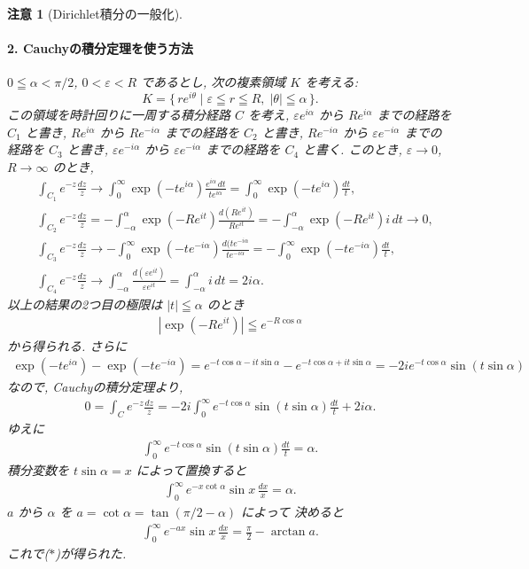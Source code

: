 \documentclass[12pt,twoside]{jarticle}
\newcommand\eps{\varepsilon}
\theoremstyle{jplain}
\theoremstyle{jplain}
\theoremstyle{jplain}
\newtheorem{remark}[theorem]{注意}
\numberwithin{theorem}{section}
\numberwithin{equation}{section}
\numberwithin{figure}{section}
\numberwithin{table}{section}
\begin{document}
\begin{remark}[Dirichlet積分の一般化]
  \paragraph{2. Cauchyの積分定理を使う方法}
  $0\leqq\alpha<\pi/2$, $0<\eps<R$ であるとし, 次の複素領域 $K$ を考える:
  \begin{equation*}
    K = \{\, re^{i\theta}\mid \eps\leqq r\leqq R,\; |\theta|\leqq\alpha\,\}.
  \end{equation*}
  この領域を時計回りに一周する積分経路 $C$ を考え,
  $\eps e^{i\alpha}$ から $Re^{i\alpha}$ までの経路を $C_1$ と書き,
  $Re^{i\alpha}$ から $Re^{-i\alpha}$ までの経路を $C_2$ と書き,
  $Re^{-i\alpha}$ から $\eps e^{-i\alpha}$ までの経路を $C_3$ と書き,
  $\eps e^{-i\alpha}$ から $\eps e^{-i\alpha}$ までの経路を $C_4$ と書く.
  このとき, $\eps\to 0$, $R\to\infty$ のとき,
  \begin{align*}
    &\int_{C_1} e^{-z}\frac{dz}{z}
    \to\int_0^\infty \exp(-te^{i\alpha})\frac{e^{i\alpha}\,dt}{te^{i\alpha}}
    =\int_0^\infty \exp(-te^{i\alpha})\frac{dt}{t},
    \\
    &\int_{C_2} e^{-z}\frac{dz}{z}
    =-\int_{-\alpha}^\alpha \exp(-Re^{it})\frac{d(Re^{it})}{Re^{it}}
    =-\int_{-\alpha}^\alpha \exp(-Re^{it})i\,dt
    \to 0,
    \\
    &\int_{C_3} e^{-z}\frac{dz}{z}
    \to-\int_0^\infty \exp(-te^{-i\alpha})\frac{d(te^{-i\alpha}}{te^{-i\alpha}}
    =-\int_0^\infty \exp(-te^{-i\alpha})\frac{dt}{t},
    \\
    &\int_{C_4} e^{-z}\frac{dz}{z}
    \to \int_{-\alpha}^\alpha \frac{d(\eps e^{it})}{\eps e^{it}}
    = \int_{-\alpha}^\alpha i\,dt
    = 2i\alpha.
  \end{align*}
  以上の結果の2つ目の極限は $|t|\leqq\alpha$ のとき
  \begin{align*}
    |\exp(-Re^{it})|\leqq e^{-R\cos\alpha}
  \end{align*}
  から得られる. さらに
  \begin{align*}
    \exp(-te^{i\alpha})-\exp(-te^{-i\alpha})
    =e^{-t\cos\alpha-it\sin\alpha}
    -e^{-t\cos\alpha+it\sin\alpha}
    =-2i e^{-t\cos\alpha}\sin(t\sin\alpha)
  \end{align*}
  なので, Cauchyの積分定理より,
  \begin{align*}
    0=\int_C e^{-z}\frac{dz}{z}
    =-2i\int_0^\infty e^{-t\cos\alpha}\sin(t\sin\alpha)\frac{dt}t
    +2i\alpha.
  \end{align*}
  ゆえに
  \begin{align*}
    \int_0^\infty e^{-t\cos\alpha}\sin(t\sin\alpha)\frac{dt}t = \alpha.
  \end{align*}
  積分変数を $t\sin\alpha=x$ によって置換すると
  \begin{align*}
    \int_0^\infty e^{-x\cot\alpha}\sin x\,\frac{dx}x = \alpha.
  \end{align*}
  $a$ から $\alpha$ を $a=\cot\alpha=\tan(\pi/2-\alpha)$ によって
  決めると
  \begin{align*}
    \int_0^\infty e^{-ax}\sin x\,\frac{dx}x = \frac\pi2-\arctan a.
  \end{align*}
  これで($*$)が得られた.


\end{remark}
\end{document}
